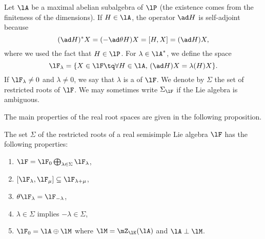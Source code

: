 Let $\lA$ be a maximal abelian subalgebra of $\lP$ (the existence comes from the finiteness of the dimensions). If $H\in\lA$, the operator $\ad H$ is self-adjoint because
\begin{equation}
	(\ad H)^*X=(-\ad\theta H)X
	=[H,X]
	=(\ad H)X,
\end{equation}
where we used the fact that $H\in\lP$.  For $\lambda\in\lA^*$, we define the space
\begin{equation}
	\lF_{\lambda}=\{ X\in\lF\tq\forall H\in\lA,\, (\ad H)X=\lambda(H)X\}.
\end{equation}
If $\lF_{\lambda}\neq 0$ and $\lambda\neq 0$, we say that $\lambda$ is a  of $\lF$. We denote by $\Sigma$ the set of restricted roots of $\lF$. We may sometimes write $\Sigma_{\lF}$ if the Lie algebra is ambiguous.

The main properties of the real root spaces are given in the following proposition.

\begin{proposition}     \label{PropPropRacincesReelles}
	The set $\Sigma$ of the restricted roots of a real semisimple Lie algebra $\lF$ has the following properties:
	\label{prop:enuc}
	\begin{enumerate}
		\item\label{enuci} $\lF=\lF_0\bigoplus_{\lambda\in\Sigma}\lF_{\lambda}$,
		\item\label{enucii} $[\lF_{\lambda},\lF_{\mu}]\subseteq\lF_{\lambda+\mu}$,
		\item\label{enuciii} $\theta\lF_{\lambda}=\lF_{-\lambda}$,
		\item\label{enuciv} $\lambda\in\Sigma$ implies $-\lambda\in\Sigma$,
		\item\label{enucv} $\lF_0=\lA\oplus\lM$ where $\lM=\mZ_{\lK}(\lA)$ and $\lA\perp\lM$.
	\end{enumerate}
\end{proposition}


